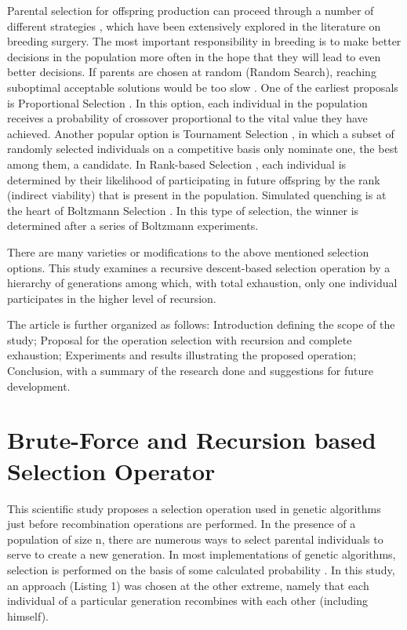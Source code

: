 \documentclass[graybox]{styles/svmult}
\begin{document}
Parental selection for offspring production can proceed through a number of different strategies \cite{balabanov-05}, which have been extensively explored in the literature on breeding surgery. The most important responsibility in breeding is to make better decisions in the population more often in the hope that they will lead to even better decisions. If parents are chosen at random (Random Search), reaching suboptimal acceptable solutions would be too slow \cite{wang-01}. One of the earliest proposals is Proportional Selection \cite{back-01}. In this option, each individual in the population receives a probability of crossover proportional to the vital value they have achieved. Another popular option is Tournament Selection \cite{miller-01}, in which a subset of randomly selected individuals on a competitive basis only nominate one, the best among them, a candidate. In Rank-based Selection \cite{grefenstette-01}, each individual is determined by their likelihood of participating in future offspring by the rank (indirect viability) that is present in the population. Simulated quenching is at the heart of Boltzmann Selection \cite{goldberg-01}. In this type of selection, the winner is determined after a series of Boltzmann experiments.

There are many varieties or modifications to the above mentioned selection options. This study examines a recursive descent-based selection operation \cite{gelfand-01} by a hierarchy of generations among which, with total exhaustion, \cite{fellows-01} only one individual participates in the higher level of recursion.

The article is further organized as follows: Introduction defining the scope of the study; Proposal for the operation selection with recursion and complete exhaustion; Experiments and results illustrating the proposed operation; Conclusion, with a summary of the research done and suggestions for future development.

\section{Brute-Force and Recursion based Selection Operator}
\label{sec:2}

This scientific study proposes a selection operation used in genetic algorithms just before recombination operations are performed. In the presence of a population of size n, there are numerous ways to select parental individuals to serve to create a new generation. In most implementations of genetic algorithms, selection is performed on the basis of some calculated probability \cite{matsui-01}. In this study, an approach (Listing 1) was chosen at the other extreme, namely that each individual of a particular generation recombines with each other (including himself).
\end{document}
